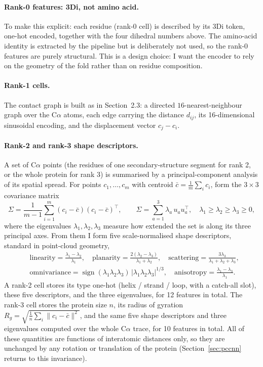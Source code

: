 \documentclass[11pt,a4paper]{article}
\theoremstyle{definition}
\begin{document}
\paragraph{Rank-0 features: 3Di, not amino acid.} To make this explicit: each
residue (rank-0 cell) is described by its 3Di token, one-hot encoded, together
with the four dihedral numbers above. The amino-acid identity is extracted by the
pipeline but is deliberately not used, so the rank-0 features are purely
structural. This is a design choice: I want the encoder to rely on the geometry
of the fold rather than on residue composition.

\paragraph{Rank-1 cells.} The contact graph is built as in Section~2.3: a directed
$16$-nearest-neighbour graph over the C$\alpha$ atoms, each edge carrying the
distance $d_{ij}$, its 16-dimensional sinusoidal encoding, and the displacement
vector $c_j-c_i$.

\paragraph{Rank-2 and rank-3 shape descriptors.} A set of C$\alpha$ points (the
residues of one secondary-structure segment for rank 2, or the whole protein for
rank 3) is summarised by a principal-component analysis of its spatial spread.
For points $c_1,\dots,c_m$ with centroid $\bar c=\frac1m\sum_i c_i$, form the
$3\times 3$ covariance matrix
\[
\Sigma=\frac{1}{m-1}\sum_{i=1}^{m}(c_i-\bar c)(c_i-\bar c)^{\top},
\qquad
\Sigma=\sum_{a=1}^{3}\lambda_a\,u_a u_a^{\top},\quad \lambda_1\ge\lambda_2\ge\lambda_3\ge 0,
\]
where the eigenvalues $\lambda_1,\lambda_2,\lambda_3$ measure how extended the set
is along its three principal axes. From them I form five scale-normalised shape
descriptors, standard in point-cloud geometry,
\[
\begin{aligned}
&\text{linearity}=\frac{\lambda_1-\lambda_2}{\lambda_1},\quad
\text{planarity}=\frac{2(\lambda_2-\lambda_3)}{\lambda_1+\lambda_2},\quad
\text{scattering}=\frac{3\lambda_3}{\lambda_1+\lambda_2+\lambda_3},\\[2pt]
&\text{omnivariance}=\operatorname{sign}(\lambda_1\lambda_2\lambda_3)\,
|\lambda_1\lambda_2\lambda_3|^{1/3},\quad
\text{anisotropy}=\frac{\lambda_1-\lambda_3}{\lambda_1}.
\end{aligned}
\]
A rank-2 cell stores its type one-hot (helix / strand / loop, with a catch-all
slot), these five descriptors, and the three eigenvalues, for 12 features in
total. The rank-3 cell stores the protein size $n$, its radius of gyration
$R_g=\sqrt{\tfrac1n\sum_i\lVert c_i-\bar c\rVert^2}$, and the same five shape
descriptors and three eigenvalues computed over the whole C$\alpha$ trace, for 10
features in total. All of these quantities are functions of interatomic distances
only, so they are unchanged by any rotation or translation of the protein
(Section~\ref{sec:pccnn} returns to this invariance).
\end{document}
